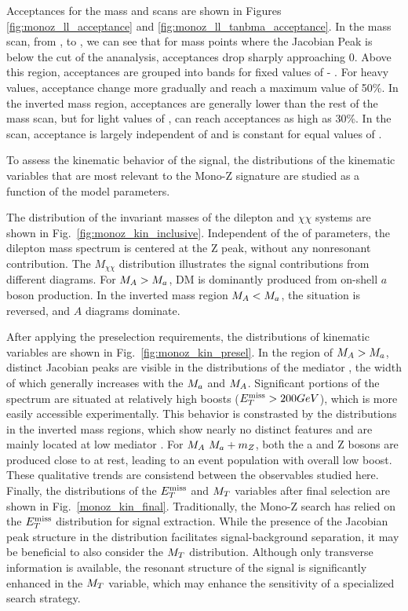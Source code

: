 Acceptances for the mass and \tanb scans are shown in Figures \ref{fig:monoz_ll_acceptance} and \ref{fig:monoz_ll_tanbma_acceptance}.  
In the mass scan, from ,  to ,  we can see that for mass points where the Jacobian Peak is below the \MET cut of the ananalysis, acceptances drop sharply approaching 0.  Above this region, acceptances are grouped into bands for fixed values of \mA - \ma.  For heavy \mA values, acceptance change more gradually and reach a maximum value of 50\%.  In the inverted mass region, acceptances are generally lower than the rest of the mass scan, but for light values of \mA, can reach acceptances as high as 30\%.  In the \tanb scan, acceptance is largely independent of \tanb and is constant for equal values of \ma.  

To assess the kinematic behavior of the signal, the distributions of the kinematic variables that are most relevant to the Mono-Z signature are studied as a function of the model parameters.

The distribution of the invariant masses of the dilepton and $\chi\chi$ systems are shown in Fig.~\ref{fig:monoz_kin_inclusive}. Independent of the of parameters, the dilepton mass spectrum is centered at the Z peak, without any nonresonant contribution. The $M_{\chi\chi}$ distribution illustrates the signal contributions from different diagrams. For $M_{A}>M_{a}$, DM is dominantly produced from on-shell $a$ boson production. In the inverted mass region $M_{A}<M_{a}$, the situation is reversed, and $A$ diagrams dominate.

After applying the preselection requirements, the distributions of kinematic variables are shown in Fig.~\ref{fig:monoz_kin_presel}. In the region of $M_{A}>M_{a}$, distinct Jacobian peaks are visible in the distributions of the mediator \pt, the width of which generally increases with the $M_{a}$ and $M_{A}$. Significant portions of the spectrum are situated at relatively high boosts ($E_T^\mathrm{miss}>200 GeV$), which is more easily accessible experimentally.
This behavior is constrasted by the distributions in the inverted mass regions, which show nearly no distinct features and are mainly located at low mediator \pt. For $M_{A}~M_{a}+m_{Z}$, both the a and Z bosons are produced close to at rest, leading to an event population with overall low boost. These qualitative trends are consistend between the observables studied here.
Finally, the distributions of the $E_T^\mathrm{miss}$ and $M_{T}$ variables after final selection are shown in Fig.~\ref{monoz_kin_final}. Traditionally, the Mono-Z search has relied on the $E_T^\mathrm{miss}$ distribution for signal extraction. While the presence of the Jacobian peak structure in the distribution facilitates signal-background separation, it may be beneficial to also consider the $M_{T}$ distribution. Although only transverse information is available, the resonant structure of the signal is significantly enhanced in the $M_{T}$ variable, which may enhance the sensitivity of a specialized search strategy.

